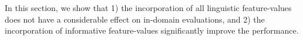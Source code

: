 \iffalse

\label{ch:improvements:first_q}
In this section, we show that 
1) the incorporation of all linguistic feature-values does not have a considerable effect on in-domain evaluations,
and 2) the incorporation of informative feature-values significantly improve the performance.

